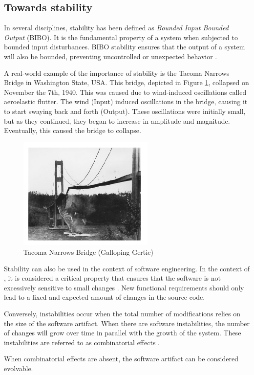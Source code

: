 \subsection{Towards stability} \label{subsec_on_stability}

In several disciplines, stability has been defined as \emph{Bounded Input Bounded Output}
(BIBO). It is the fundamental property of a system when subjected to bounded input
disturbances. BIBO stability ensures that the output of a system will also be bounded,
preventing uncontrolled or unexpected behavior \parencite[270]{mannaert_normalized_2016}. 

A real-world example of the importance of stability is the Tacoma Narrows Bridge in
Washington State, USA. This bridge, depicted in Figure \ref*{fig_bridge}, collapsed on
November the 7th, 1940. This was caused due to wind-induced oscillations called
aeroelastic flutter. The wind (Input) induced oscillations in the bridge, causing it to
start swaying back and forth (Output). These oscillations were initially small, but as
they continued, they began to increase in amplitude and magnitude. Eventually, this 
caused the bridge to collapse.

\begin{figure}[H]
    \centering
    \includegraphics[width=0.6\textwidth]{Figures/bridge.pdf}
    \caption[TNB]{Tacoma Narrows Bridge (Galloping Gertie)}
    \label{fig_bridge}
\end{figure}

Stability can also be used in the context of software engineering. In the context of
\ns, it is considered a critical property that ensures that the software is not
excessively sensitive to small changes \parencite[270]{mannaert_normalized_2016}. New
functional requirements should only lead to a fixed and expected amount of changes in
the source code. 

Conversely, instabilities occur when the total number of modifications relies on the size
of the software artifact. When there are software instabilities, the number of changes
will grow over time in parallel with the growth of the system. These instabilities are
referred to as combinatorial effects \parencite[270]{mannaert_normalized_2016}. 

When combinatorial effects are absent, the software artifact can be considered evolvable.